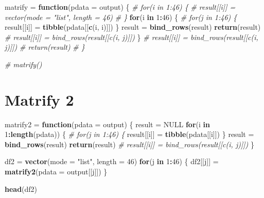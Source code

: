 \documentclass[
]{article}
\newenvironment{Shaded}{\begin{snugshade}}{\end{snugshade}}
\newcommand{\CommentTok}[1]{\textcolor[rgb]{0.56,0.35,0.01}{\textit{#1}}}
\newcommand{\ControlFlowTok}[1]{\textcolor[rgb]{0.13,0.29,0.53}{\textbf{#1}}}
\newcommand{\DataTypeTok}[1]{\textcolor[rgb]{0.13,0.29,0.53}{#1}}
\newcommand{\DecValTok}[1]{\textcolor[rgb]{0.00,0.00,0.81}{#1}}
\newcommand{\KeywordTok}[1]{\textcolor[rgb]{0.13,0.29,0.53}{\textbf{#1}}}
\newcommand{\NormalTok}[1]{#1}
\newcommand{\OperatorTok}[1]{\textcolor[rgb]{0.81,0.36,0.00}{\textbf{#1}}}
\newcommand{\OtherTok}[1]{\textcolor[rgb]{0.56,0.35,0.01}{#1}}
\newcommand{\StringTok}[1]{\textcolor[rgb]{0.31,0.60,0.02}{#1}}
\begin{document}
\begin{Shaded}
\begin{Highlighting}[]
\NormalTok{matrify =}\StringTok{ }\ControlFlowTok{function}\NormalTok{(}\DataTypeTok{pdata =}\NormalTok{ output) \{}
  \CommentTok{# for(i in 1:46) \{}
  \CommentTok{#   result[[i]] = vector(mode = "list", length = 46)}
  \CommentTok{# \}}
  \ControlFlowTok{for}\NormalTok{(i }\ControlFlowTok{in} \DecValTok{1}\OperatorTok{:}\DecValTok{46}\NormalTok{) \{}
    \CommentTok{# for(j in 1:46) \{}
\NormalTok{      result[[i]] =}\StringTok{ }\KeywordTok{tibble}\NormalTok{(pdata[[}\KeywordTok{c}\NormalTok{(i, i)]])}
\NormalTok{  \}}
\NormalTok{  result =}\StringTok{ }\KeywordTok{bind_rows}\NormalTok{(result)}
  \KeywordTok{return}\NormalTok{(result)}
    \CommentTok{# result[[i]] = bind_rows(result[[c(i, j)]])}
\NormalTok{\}}
  \CommentTok{# result[[i]] = bind_rows(result[[c(i, j)]])}
\CommentTok{#   return(result)}
\CommentTok{# \}}


\CommentTok{# matrify()}
\end{Highlighting}
\end{Shaded}

\hypertarget{matrify-2}{%
\section{Matrify 2}\label{matrify-2}}

\begin{Shaded}
\begin{Highlighting}[]
\NormalTok{matrify2 =}\StringTok{ }\ControlFlowTok{function}\NormalTok{(}\DataTypeTok{pdata =}\NormalTok{ output) \{}
\NormalTok{  result =}\StringTok{ }\OtherTok{NULL}
  \ControlFlowTok{for}\NormalTok{(i }\ControlFlowTok{in} \DecValTok{1}\OperatorTok{:}\KeywordTok{length}\NormalTok{(pdata)) \{}
    \CommentTok{# for(j in 1:46) \{}
\NormalTok{      result[[i]] =}\StringTok{ }\KeywordTok{tibble}\NormalTok{(pdata[[i]])}
\NormalTok{  \}}
\NormalTok{  result =}\StringTok{ }\KeywordTok{bind_rows}\NormalTok{(result)}
  \KeywordTok{return}\NormalTok{(result)}
    \CommentTok{# result[[i]] = bind_rows(result[[c(i, j)]])}
\NormalTok{\}}

\NormalTok{df2 =}\StringTok{ }\KeywordTok{vector}\NormalTok{(}\DataTypeTok{mode =} \StringTok{"list"}\NormalTok{, }\DataTypeTok{length =} \DecValTok{46}\NormalTok{)}
\ControlFlowTok{for}\NormalTok{(j }\ControlFlowTok{in} \DecValTok{1}\OperatorTok{:}\DecValTok{46}\NormalTok{) \{}
\NormalTok{  df2[[j]] =}\StringTok{ }\KeywordTok{matrify2}\NormalTok{(}\DataTypeTok{pdata =}\NormalTok{ output[[j]])}
\NormalTok{\}}

\KeywordTok{head}\NormalTok{(df2)}
\end{Highlighting}
\end{Shaded}
\end{document}
